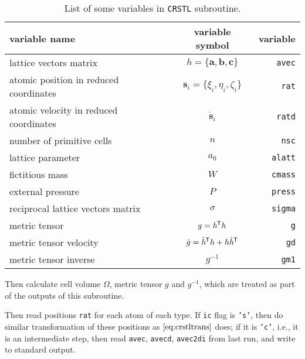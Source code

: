 \begin{table}[h]
 \centering
 \caption{List of some variables in \texttt{CRSTL} subroutine.}
 \begin{tabular}{@{}lcr@{}}
  \toprule
  {variable name}                        & variable symbol                                 & variable       \\
  \midrule
  lattice vectors matrix                 & $h = \{ \bm{a}, \bm{b}, \bm{c} \}$              & \texttt{avec}  \\
  atomic position in reduced coordinates & $\bm{s}_i = \{\xi_i, \eta_i, \zeta_i\}$         & \texttt{rat}   \\
  atomic velocity in reduced coordinates & $\dot{ \bm{s} }_i$                              & \texttt{ratd}  \\
  number of primitive cells              & $n$                                             & \texttt{nsc}   \\
  lattice parameter                      & $a_0$                                           & \texttt{alatt} \\
  fictitious mass                        & $W$                                             & \texttt{cmass} \\
  external pressure                      & $P$                                             & \texttt{press} \\
  reciprocal lattice vectors matrix      & $\sigma$                                        & \texttt{sigma} \\
  metric tensor                          & $g = h ^{\mkern-1.5mu\mathsf{T}} h$                                 & \texttt{g}     \\
  metric tensor velocity                 & $\dot{g} = \dot{ h }^{\mkern-1.5mu\mathsf{T}} h + h \dot{ h }^{\mkern-1.5mu\mathsf{T}}$ & \texttt{gd}    \\
  metric tensor inverse                  & $g^{-1}$                                        & \texttt{gm1}   \\
  \bottomrule
 \end{tabular}%
 \label{tab:crstl}%
\end{table}%

Then calculate cell volume $\Omega$, metric tensor $g$ and $g^{-1}$, which are
treated as part of the outputs of this subroutine.

Then read positions \texttt{rat} for each atom of each type.
If \texttt{ic} flag is \texttt{'s'},
then do similar transformation of these positions as $\eqref{eq:crstltrans}$ does;
if it is \texttt{'c'}, i.e., it is an intermediate step, then read
\texttt{avec}, \texttt{avecd}, \texttt{avec2di} from last run,
and write to standard output.
